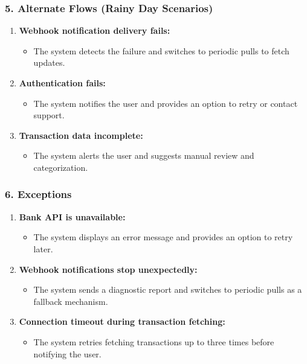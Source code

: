\subsubsection*{5. Alternate Flows (Rainy Day Scenarios)}
\begin{enumerate}[label=5.\arabic*]
    \item \textbf{Webhook notification delivery fails:}
    \begin{itemize}
        \item The system detects the failure and switches to periodic pulls to fetch updates.
    \end{itemize}
    \item \textbf{Authentication fails:}
    \begin{itemize}
        \item The system notifies the user and provides an option to retry or contact support.
    \end{itemize}
    \item \textbf{Transaction data incomplete:}
    \begin{itemize}
        \item The system alerts the user and suggests manual review and categorization.
    \end{itemize}
\end{enumerate}

\subsubsection*{6. Exceptions}
\begin{enumerate}[label=6.\arabic*]
    \item \textbf{Bank API is unavailable:}
    \begin{itemize}
        \item The system displays an error message and provides an option to retry later.
    \end{itemize}
    \item \textbf{Webhook notifications stop unexpectedly:}
    \begin{itemize}
        \item The system sends a diagnostic report and switches to periodic pulls as a fallback mechanism.
    \end{itemize}
    \item \textbf{Connection timeout during transaction fetching:}
    \begin{itemize}
        \item The system retries fetching transactions up to three times before notifying the user.
    \end{itemize}
\end{enumerate}

